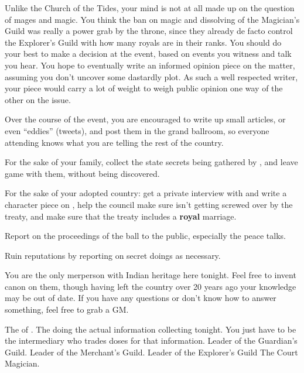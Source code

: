 \documentclass[char]{NeptuneBall}
\begin{document}
Unlike the Church of the Tides, your mind is not at all made up on the question of mages and magic. You think the ban on magic and dissolving of the Magician's Guild was really a power grab by the throne, since they already de facto control the Explorer’s Guild with how many royals are in their ranks. You should do your best to make a decision at the event, based on events you witness and talk you hear. You hope to eventually write an informed opinion piece on the matter, assuming you don't uncover some dastardly plot. As such a well respected writer, your piece would carry a lot of weight to weigh public opinion one way of the other on the issue.

Over the course of the event, you are encouraged to write up small articles, or even “eddies” (tweets), and post them in the grand ballroom, so everyone attending knows what you are telling the rest of the country.

\begin{itemz}[Goals]
  \item For the sake of your family, collect the state secrets being gathered by \cWillow{}, and leave game with them, without being discovered.
	\item For the sake of your adopted country: get a private interview with \cPrince{} and write a character piece on \cPrince{\them}, help the council make sure \pAtlantis{} isn't getting screwed over by the treaty, and make sure that the treaty includes a \textbf{royal} marriage.
	\item Report on the proceedings of the ball to the public, especially the peace talks.
	\item Ruin reputations by reporting on secret doings as necessary.
\end{itemz}

\begin{itemz}[Notes]
  \item You are the only merperson with Indian heritage here tonight. Feel free to invent canon on them, though having left the country over 20 years ago your knowledge may be out of date. If you have any questions or don't know how to answer something, feel free to grab a GM.
\end{itemz}


\begin{contacts}
  \contact{\cKing{}} The \cKing{\King} of \pAtlantis{}.
	\contact{\cWillow{}} The \cWillow{\kid} doing the actual information collecting tonight. You just have to be the intermediary who trades \iDrug{} doses for that information.
  \contact{\cGeneral{}} Leader of the Guardian's Guild.
  \contact{\cSlave{}} Leader of the Merchant's Guild.
  \contact{\cPriest{}} Leader of the Explorer's Guild
  \contact{\cManta{}} The Court Magician.
\end{contacts}
\end{document}

